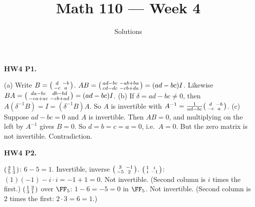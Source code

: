 \documentclass[10pt]{scrartcl}
\title{Math 110 --- Week 4}
\subtitle{Solutions}
\author{}\date{}\ihead{}
\begin{document}
\setlength{\parskip}{1pt}\renewcommand{\bigskip}{\vspace{3pt}}\setlength{\abovedisplayskip}{3pt}\setlength{\belowdisplayskip}{3pt}\setlength{\abovedisplayshortskip}{2pt}\setlength{\belowdisplayshortskip}{2pt}
\maketitle

\begin{prob}\textbf{HW4 P1.}\par{}
\begin{steps}
  \ii (a) Write $B=\begin{psmallmatrix}d&-b\\-c&a\end{psmallmatrix}$. $AB=\begin{psmallmatrix}ad-bc&-ab+ba\\cd-dc&-cb+da\end{psmallmatrix}=(ad-bc)I$. Likewise $BA=\begin{psmallmatrix}da-bc&db-bd\\-ca+ac&-cb+ad\end{psmallmatrix}=(ad-bc)I$.
  \ii (b) If $\delta=ad-bc\ne0$, then $A(\delta^{-1}B)=I=(\delta^{-1}B)A$. So $A$ is invertible with $A^{-1}=\frac1{ad-bc}\begin{psmallmatrix}d&-b\\-c&a\end{psmallmatrix}$.
  \ii (c) Suppose $ad-bc=0$ and $A$ is invertible. Then $AB=0$, and multiplying on the left by $A^{-1}$ gives $B=0$. So $d=b=c=a=0$, i.e.\ $A=0$. But the zero matrix is not invertible. Contradiction.
\end{steps}
\end{prob}

\begin{prob}\textbf{HW4 P2.}\par{}
\begin{steps}
  \ii $\begin{psmallmatrix}2&1\\5&3\end{psmallmatrix}$: $6-5=1$. Invertible, inverse $\begin{psmallmatrix}3&-1\\-5&2\end{psmallmatrix}$.
  \ii $\begin{psmallmatrix}1&i\\i&-1\end{psmallmatrix}$: $(1)(-1)-i\cdot i=-1+1=0$. Not invertible. (Second column is $i$ times the first.)
  \ii $\begin{psmallmatrix}1&2\\3&1\end{psmallmatrix}$ over $\FF_5$: $1-6=-5=0$ in $\FF_5$. Not invertible. (Second column is $2$ times the first: $2\cdot3=6=1$.)
\end{steps}
\end{prob}
\end{document}
